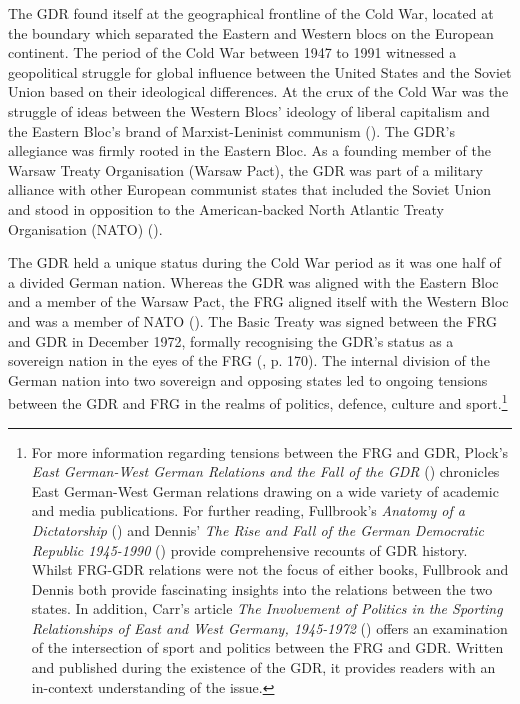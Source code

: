 The GDR found itself at the geographical frontline of the Cold War, located at the boundary which separated the Eastern and Western blocs on the European continent. The period of the Cold War between 1947 to 1991 witnessed a geopolitical struggle for global influence between the United States and the Soviet Union based on their ideological differences. At the crux of the Cold War was the struggle of ideas between the Western Blocs’ ideology of liberal capitalism and the Eastern Bloc’s brand of Marxist-Leninist communism (\cite{sargent2015}). The GDR’s allegiance was firmly rooted in the Eastern Bloc. As a founding member of the Warsaw Treaty Organisation (Warsaw Pact), the GDR was part of a military alliance with other European communist states that included the Soviet Union and stood in opposition to the American-backed North Atlantic Treaty Organisation (NATO) (\cite{wagner2012}).

The GDR held a unique status during the Cold War period as it was one half of a divided German nation. Whereas the GDR was aligned with the Eastern Bloc and a member of the Warsaw Pact, the FRG aligned itself with the Western Bloc and was a member of NATO (\cite{wagner2012}). The Basic Treaty was signed between the FRG and GDR in December 1972, formally recognising the GDR’s status as a sovereign nation in the eyes of the FRG (\cite{dennis2000}, p. 170). The internal division of the German nation into two sovereign and opposing states led to ongoing tensions between the GDR and FRG in the realms of politics, defence, culture and sport.\footnote{For more information regarding tensions between the FRG and GDR, Plock’s \textit{East German-West German Relations and the Fall of the GDR} (\citeyear{plock1993}) chronicles East German-West German relations drawing on a wide variety of academic and media publications. For further reading, Fullbrook’s \textit{Anatomy of a Dictatorship} (\citeyear{fullbrook1995}) and Dennis’ \textit{The Rise and Fall of the German Democratic Republic 1945-1990} (\citeyear{dennis2000}) provide comprehensive recounts of GDR history. Whilst FRG-GDR relations were not the focus of either books, Fullbrook and Dennis both provide fascinating insights into the relations between the two states. In addition, Carr’s article \textit{The Involvement of Politics in the Sporting Relationships of East and West Germany, 1945-1972} (\citeyear{carr1980}) offers an examination of the intersection of sport and politics between the FRG and GDR. Written and published during the existence of the GDR, it provides readers with an in-context understanding of the issue.}

